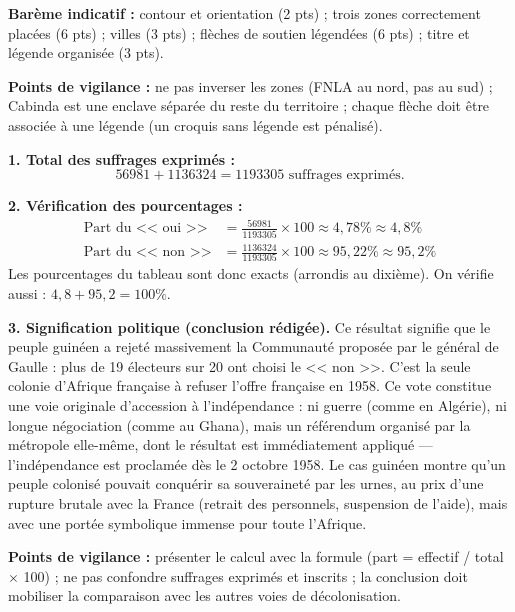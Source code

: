 \documentclass[11pt]{article}
\begin{document}
\begin{corrige}
\textbf{Barème indicatif :} contour et orientation (2 pts) ; trois zones correctement placées (6 pts) ; villes (3 pts) ; flèches de soutien légendées (6 pts) ; titre et légende organisée (3 pts).

\textbf{Points de vigilance :} ne pas inverser les zones (FNLA au nord, pas au sud) ; Cabinda est une enclave séparée du reste du territoire ; chaque flèche doit être associée à une légende (un croquis sans légende est pénalisé).
\end{corrige}

\begin{corrige}
\textbf{1. Total des suffrages exprimés :}
\[ \num{56981} + \num{1136324} = \num{1193305} \text{ suffrages exprimés.} \]

\textbf{2. Vérification des pourcentages :}
\begin{align*}
\text{Part du << oui >>} &= \frac{\num{56981}}{\num{1193305}} \times 100 \approx 4,78 \% \approx 4,8 \% \\
\text{Part du << non >>} &= \frac{\num{1136324}}{\num{1193305}} \times 100 \approx 95,22 \% \approx 95,2 \%
\end{align*}
Les pourcentages du tableau sont donc exacts (arrondis au dixième). On vérifie aussi : $4,8 + 95,2 = 100 \%$.

\textbf{3. Signification politique (conclusion rédigée).} Ce résultat signifie que le peuple guinéen a rejeté massivement la Communauté proposée par le général de Gaulle : plus de 19 électeurs sur 20 ont choisi le << non >>. C'est la seule colonie d'Afrique française à refuser l'offre française en 1958. Ce vote constitue une voie originale d'accession à l'indépendance : ni guerre (comme en Algérie), ni longue négociation (comme au Ghana), mais un référendum organisé par la métropole elle-même, dont le résultat est immédiatement appliqué — l'indépendance est proclamée dès le 2 octobre 1958. Le cas guinéen montre qu'un peuple colonisé pouvait conquérir sa souveraineté par les urnes, au prix d'une rupture brutale avec la France (retrait des personnels, suspension de l'aide), mais avec une portée symbolique immense pour toute l'Afrique.

\textbf{Points de vigilance :} présenter le calcul avec la formule (part = effectif / total $\times$ 100) ; ne pas confondre suffrages exprimés et inscrits ; la conclusion doit mobiliser la comparaison avec les autres voies de décolonisation.
\end{corrige}
\end{document}
